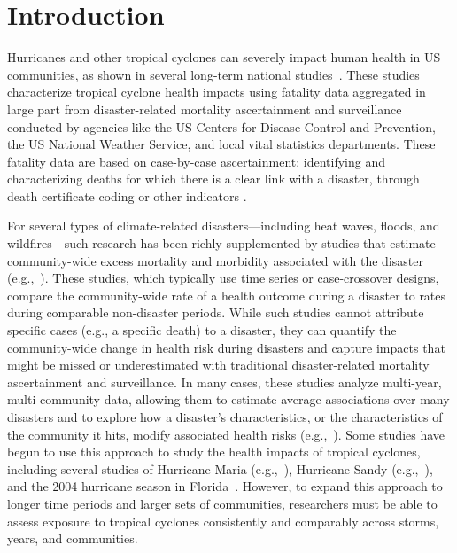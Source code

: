 \section*{Introduction}

\acresetall

Hurricanes and other tropical cyclones can severely impact human health in
\ac{US} communities, as shown in several long-term national
studies~\parencite{rappaport2000, rappaport2014fatalities,
rappaport2016fatalities, czajkowski2010fatal, czajkowski2011, moore2012}.
These studies characterize tropical cyclone health impacts using fatality data
aggregated in large part from disaster-related mortality ascertainment and
surveillance conducted by agencies like the \ac{US} Centers for Disease Control
and Prevention, the \ac{US} National Weather Service, and local vital
statistics departments. These fatality data are based on case-by-case
ascertainment: identifying and characterizing deaths for which there is a clear
link with a disaster, through death certificate coding or other indicators
\parencite{rocha2017medicolegal}.  

For several types of climate-related disasters---including heat waves, floods,
and wildfires---such research has been richly supplemented by studies that
estimate community-wide excess mortality and morbidity associated with the
disaster (e.g.,~\cite{anderson2010heat, son2012impact, haikerwal2015impact,
liu2017wildfire, milojevic2017mental}).  These studies, which typically use time
series or case-crossover designs, compare the community-wide rate of a health
outcome during a disaster to rates during comparable
non-disaster periods.  While such studies cannot attribute specific cases
(e.g., a specific death) to a disaster, they can quantify the community-wide
change in health risk during disasters and capture impacts that might be missed
or underestimated with traditional disaster-related mortality ascertainment and
surveillance.  In many cases, these studies analyze multi-year, multi-community
data, allowing them to estimate average associations over many disasters and to
explore how a disaster's characteristics, or the characteristics of the
community it hits, modify associated health risks
(e.g.,~\cite{anderson2010heat, son2012impact, liu2017wildfire}).  Some studies
have begun to use this approach to study the health impacts of tropical
cyclones, including several studies of Hurricane Maria
(e.g.,~\cite{santos2018use, santos2018differential}), Hurricane Sandy
(e.g.,~\cite{kim2016, mongin2017, swerdel2014}), and the 2004 hurricane season
in Florida~\parencite{mckinney2011}.  However, to expand this approach to
longer time periods and larger sets of communities, researchers must be able to
assess exposure to tropical cyclones consistently and comparably across storms,
years, and communities.  

